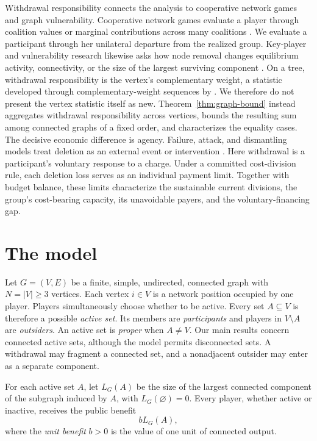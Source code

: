 \documentclass[preprint,12pt,authoryear]{elsarticle}
\newcommand{\LCC}{L}
\begin{document}
Withdrawal responsibility connects the analysis to cooperative network games
and graph vulnerability. Cooperative network games evaluate a player through
coalition values or marginal contributions across many coalitions
\citep{Myerson1977,BachrachEtAl2013,VanDerZandenEtAl2023}. We evaluate a
participant through her unilateral departure from the realized group.
Key-player and vulnerability research likewise asks how node removal changes equilibrium activity, connectivity, or the size of the largest surviving component 
\citep{BallesterEtAl2006,Borgatti2006,BarefootEtAl1987,BaggaEtAl1992,
ChenHero2013,MattaEtAl2017}. On a tree, withdrawal responsibility is the
vertex's complementary weight, a statistic  developed through complementary-weight sequences by \citet{Shang2022}.
We therefore do not present the vertex statistic itself as new.
Theorem~\ref{thm:graph-bound} instead aggregates withdrawal responsibility across vertices, bounds the resulting sum among connected graphs of a fixed order, and characterizes the equality cases. The decisive economic difference is agency. Failure, attack, and dismantling models treat deletion as an external event or intervention 
\citep{AlbertEtAl2000,CallawayEtAl2000,SchneiderEtAl2011,
BraunsteinEtAl2016}. Here withdrawal is a participant’s voluntary response to a charge. Under a committed cost-division rule, each deletion loss serves as an individual payment limit. Together with budget balance, these limits characterize the sustainable current divisions, the group’s cost-bearing capacity, its unavoidable payers, and the voluntary-financing gap.

\section{The model}
\label{sec:model}

Let \(G=(V,E)\) be a finite, simple, undirected, connected graph with
\(N=|V|\geq3\) vertices. Each vertex \(i\in V\) is a network position occupied
by one player. Players simultaneously choose whether to be active. Every set
\(A\subseteq V\) is therefore a possible \emph{active set}. Its members are
\emph{participants} and players in \(V\setminus A\) are \emph{outsiders}. An
active set is \emph{proper} when \(A\ne V\). Our main results concern connected
active sets, although the model permits disconnected sets. A withdrawal may
fragment a connected set, and a nonadjacent outsider may enter as a separate
component.

For each active set \(A\), let \(\LCC_G(A)\) be the size of the largest
connected component of the subgraph induced by \(A\), with
\(\LCC_G(\varnothing)=0\). Every player, whether active or inactive, receives
the public benefit
\[
 b\LCC_G(A),
\]
where the \emph{unit benefit} \(b>0\) is the value of one unit of connected
output.
\end{document}
